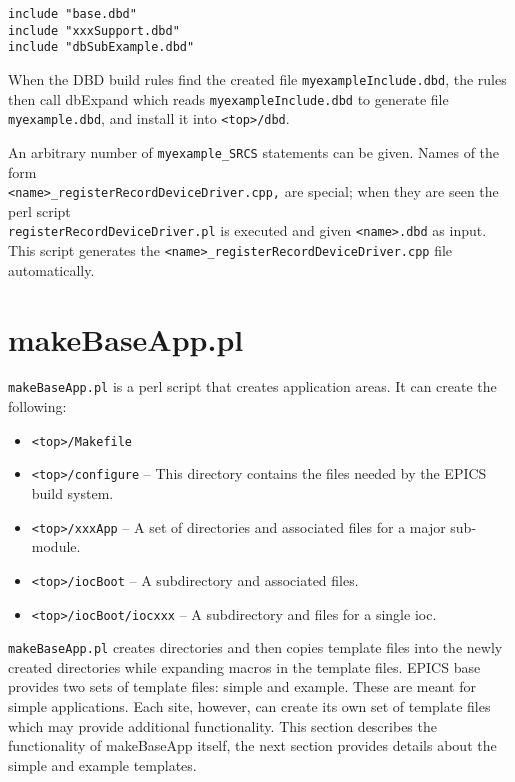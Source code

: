 \begin{verbatim}
include "base.dbd"
include "xxxSupport.dbd"
include "dbSubExample.dbd"
\end{verbatim}

When the DBD build rules find the created file \verb|myexampleInclude.dbd|, the rules then call dbExpand which reads 
\verb|myexampleInclude.dbd| to generate file \verb|myexample.dbd|, and install it into \verb|<top>/dbd|.

An arbitrary number of \verb|myexample_SRCS| statements can be given. Names of the form \\
\verb|<name>_registerRecordDeviceDriver.cpp,| are special; when they are seen the perl script \\
\verb|registerRecordDeviceDriver.pl| is executed and given \verb|<name>.dbd| as input.  This script generates the
\verb|<name>_registerRecordDeviceDriver.cpp| file automatically.

\section{makeBaseApp.pl}

\verb|makeBaseApp.pl| is a perl script that creates application areas. It can create the following:

\begin{itemize}
\item \verb|<top>/Makefile|
\item \verb|<top>/configure| -- This directory contains the files needed by the EPICS build system.
\item \verb|<top>/xxxApp| -- A set of directories and associated files for a  major sub-module.
\item \verb|<top>/iocBoot| -- A subdirectory and associated files.
\item \verb|<top>/iocBoot/iocxxx| -- A subdirectory and files for a single ioc.
\end{itemize}

\verb|makeBaseApp.pl| creates directories and then copies template files into the newly created directories while expanding macros in the template files.
EPICS base provides two sets of template files: simple and example.
These are meant for simple applications.
Each site, however, can create its own set of template files which may provide additional functionality.
This section describes the functionality of makeBaseApp itself, the next section provides details about the simple and example templates.

